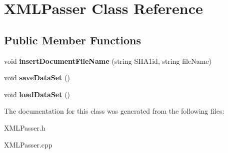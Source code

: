 \hypertarget{class_x_m_l_passer}{\section{X\+M\+L\+Passer Class Reference}
\label{class_x_m_l_passer}
}
\subsection*{Public Member Functions}
\begin{DoxyCompactItemize}
\item 
\hypertarget{class_x_m_l_passer_ad8fa5dd8cd64bb27a8206c8faf743b1c}{void {\bfseries insert\+Document\+File\+Name} (string S\+H\+A1id, string file\+Name)}\label{class_x_m_l_passer_ad8fa5dd8cd64bb27a8206c8faf743b1c}

\item 
\hypertarget{class_x_m_l_passer_afd6891b7bfe1c03b0d714325adced097}{void {\bfseries save\+Data\+Set} ()}\label{class_x_m_l_passer_afd6891b7bfe1c03b0d714325adced097}

\item 
\hypertarget{class_x_m_l_passer_a314e1d12e844ffaff1f47428d9a13e5f}{void {\bfseries load\+Data\+Set} ()}\label{class_x_m_l_passer_a314e1d12e844ffaff1f47428d9a13e5f}

\end{DoxyCompactItemize}


The documentation for this class was generated from the following files\+:\begin{DoxyCompactItemize}
\item 
X\+M\+L\+Passer.\+h\item 
X\+M\+L\+Passer.\+cpp\end{DoxyCompactItemize}
